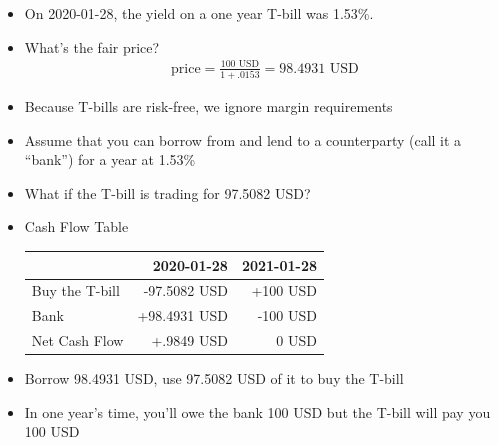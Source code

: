 \documentclass{beamer}
\begin{document}
\begin{frame}{}
\begin{itemize}
\item On 2020-01-28, the yield on a one year T-bill was 1.53\%. 
\item What's the fair price?
\begin{align*}
	\text{price}=\frac{100\text{ USD}}{1+.0153}=98.4931\text{ USD}
\end{align*}
\item Because T-bills are risk-free, we ignore margin requirements
\item Assume that you can borrow from and lend to a counterparty (call it a ``bank'') for a year at 1.53\%
\end{itemize}
\end{frame}

\begin{frame}{}
\begin{itemize}
\item What if the T-bill is trading for 97.5082 USD? 
\item Cash Flow Table
\begin{table}
\begin{center}
\begin{tabular}{lrr}
	& \textbf{2020-01-28} & \textbf{2021-01-28} \\ \hline
	Buy the T-bill & -97.5082 USD & +100 USD \\
	Bank & +98.4931 USD & -100 USD\\ \hline
	Net Cash Flow & +.9849 USD & 0 USD 
\end{tabular}
\end{center}
\end{table}
\item Borrow 98.4931 USD, use 97.5082 USD of it to buy the T-bill
\item In one year's time, you'll owe the bank 100 USD but the T-bill will pay you 100 USD
\end{itemize}
\end{frame}
\end{document}
